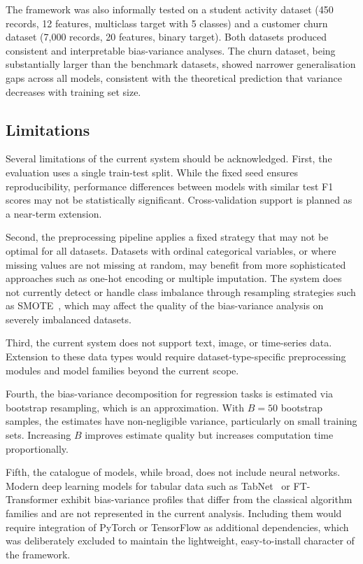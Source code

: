 \documentclass[conference]{IEEEtran}
\begin{document}
The framework was also informally tested on a student activity dataset (450 records, 12 features, multiclass target with 5 classes) and a customer churn dataset (7,000 records, 20 features, binary target). Both datasets produced consistent and interpretable bias-variance analyses. The churn dataset, being substantially larger than the benchmark datasets, showed narrower generalisation gaps across all models, consistent with the theoretical prediction that variance decreases with training set size.

\subsection{Limitations}

Several limitations of the current system should be acknowledged. First, the evaluation uses a single train-test split. While the fixed seed ensures reproducibility, performance differences between models with similar test F1 scores may not be statistically significant. Cross-validation support is planned as a near-term extension.

Second, the preprocessing pipeline applies a fixed strategy that may not be optimal for all datasets. Datasets with ordinal categorical variables, or where missing values are not missing at random, may benefit from more sophisticated approaches such as one-hot encoding or multiple imputation. The system does not currently detect or handle class imbalance through resampling strategies such as SMOTE~\cite{b35}, which may affect the quality of the bias-variance analysis on severely imbalanced datasets.

Third, the current system does not support text, image, or time-series data. Extension to these data types would require dataset-type-specific preprocessing modules and model families beyond the current scope.

Fourth, the bias-variance decomposition for regression tasks is estimated via bootstrap resampling, which is an approximation. With $B=50$ bootstrap samples, the estimates have non-negligible variance, particularly on small training sets. Increasing $B$ improves estimate quality but increases computation time proportionally.

Fifth, the catalogue of models, while broad, does not include neural networks. Modern deep learning models for tabular data such as TabNet~\cite{b36} or FT-Transformer exhibit bias-variance profiles that differ from the classical algorithm families and are not represented in the current analysis. Including them would require integration of PyTorch or TensorFlow as additional dependencies, which was deliberately excluded to maintain the lightweight, easy-to-install character of the framework.
\end{document}
